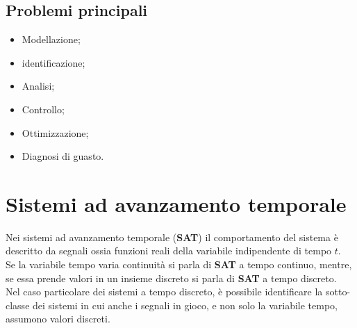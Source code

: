 \documentclass{book}
\begin{document}
\subsection{Problemi principali}
\begin{itemize}
    \item Modellazione;
    \item identificazione;
    \item Analisi;
    \item Controllo;
    \item Ottimizzazione;
    \item Diagnosi di guasto.
\end{itemize}
\section{Sistemi ad avanzamento temporale}
Nei sistemi ad avanzamento temporale ({\bf SAT}) il comportamento del sistema è descritto
da segnali ossia funzioni reali della variabile indipendente di tempo $t$.\\
Se la variabile tempo varia continuità si parla di {\bf SAT} a {\color{red} tempo continuo},
mentre, se essa prende valori in un insieme discreto si parla di {\bf SAT} {\color{red} a
  tempo discreto}.\\
Nel caso particolare dei sistemi a tempo discreto, è possibile identificare la sotto-classe
dei sistemi in cui anche i segnali in gioco, e non solo la variabile tempo, assumono valori
discreti.  
\end{document}
